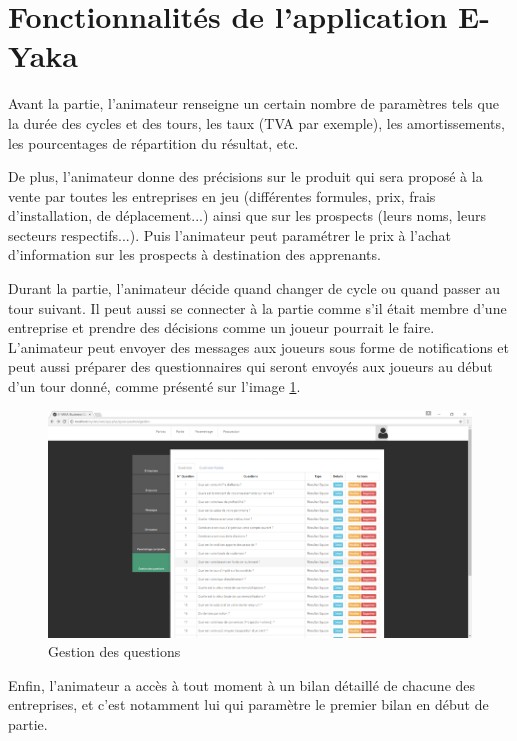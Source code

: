     \section{Fonctionnalités de l'application E-Yaka}
    
        Avant la partie, l'animateur renseigne un certain nombre de paramètres tels que la durée des cycles et des tours, les taux (TVA par exemple), les amortissements, les pourcentages de répartition du résultat, etc.

        De plus, l'animateur donne des précisions sur le produit qui sera proposé à la vente par toutes les entreprises en jeu (différentes formules, prix, frais d'installation, de déplacement...) ainsi que sur les prospects (leurs noms, leurs secteurs respectifs...). Puis l'animateur peut paramétrer le prix à l'achat d'information sur les prospects à destination des apprenants.

        Durant la partie, l'animateur décide quand changer de cycle ou quand passer au tour suivant. Il peut aussi se connecter à la partie comme s'il était membre d'une entreprise et prendre des décisions comme un joueur pourrait le faire.
        L'animateur peut envoyer des messages aux joueurs sous forme de notifications et peut aussi préparer des questionnaires qui seront envoyés aux joueurs au début d'un tour donné, comme présenté sur l'image \ref{questionnaire}.

        \begin{figure}
            \includegraphics[scale=0.88]{images/questionnaire.png}
            \caption{Gestion des questions}
            \label{questionnaire}
        \end{figure}


        Enfin, l'animateur a accès à tout moment à un bilan détaillé de chacune des entreprises, et c'est notamment lui qui paramètre le premier bilan en début de partie.

